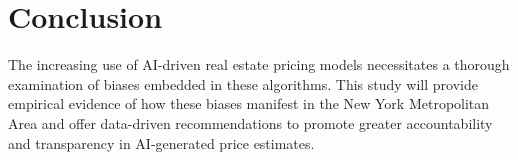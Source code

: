 \documentclass{article}
\begin{document}
\section{Conclusion}
The increasing use of AI-driven real estate pricing models necessitates a thorough examination of biases embedded in these algorithms. This study will provide empirical evidence of how these biases manifest in the New York Metropolitan Area and offer data-driven recommendations to promote greater accountability and transparency in AI-generated price estimates.
\end{document}
